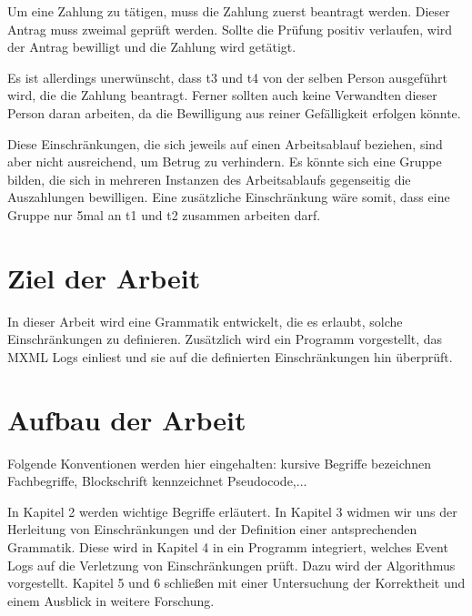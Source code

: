 Um eine Zahlung zu tätigen, muss die Zahlung zuerst beantragt werden. Dieser Antrag muss zweimal geprüft werden. Sollte die Prüfung positiv verlaufen, wird der Antrag bewilligt und die Zahlung wird getätigt.

Es ist allerdings unerwünscht, dass t3 und t4 von der selben Person ausgeführt wird, die die Zahlung beantragt. Ferner sollten auch keine Verwandten dieser Person daran arbeiten, da die Bewilligung aus reiner Gefälligkeit erfolgen könnte.

Diese Einschränkungen, die sich jeweils auf einen Arbeitsablauf beziehen, sind aber nicht ausreichend, um Betrug zu verhindern. 
Es könnte sich eine Gruppe bilden, die sich in mehreren Instanzen des Arbeitsablaufs gegenseitig die Auszahlungen bewilligen.
Eine zusätzliche Einschränkung wäre somit, dass eine Gruppe nur 5mal an t1 und t2 zusammen arbeiten darf.






\section{Ziel der Arbeit}

In dieser Arbeit wird eine Grammatik entwickelt, die es erlaubt, solche Einschränkungen zu definieren. Zusätzlich wird ein Programm vorgestellt, das MXML Logs einliest und sie auf die definierten Einschränkungen hin überprüft.




\section{Aufbau der Arbeit}
Folgende Konventionen werden hier eingehalten: kursive Begriffe  bezeichnen Fachbegriffe, Blockschrift kennzeichnet Pseudocode,...

In Kapitel 2 werden wichtige Begriffe erläutert. In Kapitel 3 widmen wir uns der  Herleitung von Einschränkungen und der Definition einer antsprechenden Grammatik. Diese wird in Kapitel 4 in ein Programm integriert, welches Event Logs auf die Verletzung von Einschränkungen prüft. Dazu wird der Algorithmus vorgestellt. Kapitel 5 und 6 schließen mit einer Untersuchung der Korrektheit und einem Ausblick in weitere Forschung.

